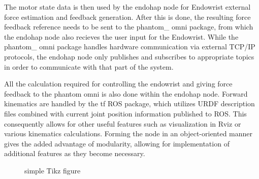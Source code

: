 The motor state data is then used by the endohap node for Endowrist external force estimation and feedback generation.
After this is done, the resulting force feedback reference needs to be sent to the phantom\_ omni package, from which the endohap node also recieves the user input for the Endowrist. While the phantom\_ omni package handles hardware communication via external TCP/IP protocols, the endohap node only publishes and subscribes to appropriate topics in order to communicate with that part of the system.

All the calculation required for controlling the endowrist and giving force feedback to the phantom omni is also done within the endohap node. Forward kinematics are handled by the tf ROS package, which utilizes URDF description files combined with current joint position information published to ROS.
This consequently allows for other useful features such as visualization in Rviz or various kinematics calculations.
Forming the node in an object-oriented manner gives the added advantage of modularity, allowing for implementation of additional features as they become necessary. 

\begin{figure}[H]
\centering
{}%
\caption{simple Tikz figure}
\end{figure}
